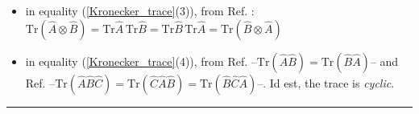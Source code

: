 \documentclass[11pt]{article}
\numberwithin{equation}{section} %
\numberwithin{figure}{section} %
\begin{document}
\begin{itemize}
\item in equality (\ref{Kronecker_trace}(3)), from Ref. \cite[p.~250, ex.~4.2.12]{Trace}: $\textrm{Tr}(\hat{A}\otimes\hat{B})=\textrm{Tr}\hat{A}\,\textrm{Tr}\hat{B}=\textrm{Tr}\hat{B}\,\textrm{Tr}\hat{A}=\textrm{Tr}(\hat{B}\otimes\hat{A})$
\item in equality (\ref{Kronecker_trace}(4)), from Ref. \cite[p.~56, Theo.~4.3]{TraceAB} --$\textrm{Tr}(\hat{A}\hat{B})=\textrm{Tr}(\hat{B}\hat{A})$-- and Ref. \cite[p.~56, cor.~4.1]{TraceAB} --$\textrm{Tr}(\hat{A}\hat{B}\hat{C})=\textrm{Tr}(\hat{C}\hat{A}\hat{B})=\textrm{Tr}(\hat{B}\hat{C}\hat{A})$--. Id est, the trace is \emph{cyclic}.
\end{itemize}

  

\noindent
{\color{red} \rule{\linewidth}{0.5mm} }
\end{document}

